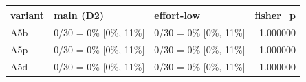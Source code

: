 \begin{tabular}{lllr}
\toprule
variant & main (D2) & effort-low & fisher\_p \\
\midrule
A5b & 0/30 = 0\% [0\%, 11\%] & 0/30 = 0\% [0\%, 11\%] & 1.000000 \\
A5p & 0/30 = 0\% [0\%, 11\%] & 0/30 = 0\% [0\%, 11\%] & 1.000000 \\
A5d & 0/30 = 0\% [0\%, 11\%] & 0/30 = 0\% [0\%, 11\%] & 1.000000 \\
\bottomrule
\end{tabular}
